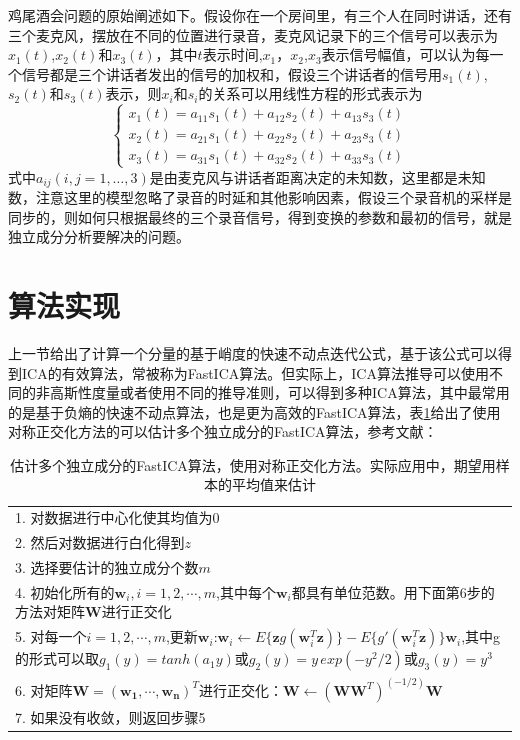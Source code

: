 \documentclass[UTF8,zihao=5,a4paper]{ctexart}
\begin{document}
鸡尾酒会问题的原始阐述如下。假设你在一个房间里，有三个人在同时讲话，还有三个麦克风，摆放在不同的位置进行录音，麦克风记录下的三个信号可以表示为$x_1(t)$,$x_2(t)$和$x_3(t)$，其中$t$表示时间,$x_1$，$x_2$,$x_3$表示信号幅值，可以认为每一个信号都是三个讲话者发出的信号的加权和，假设三个讲话者的信号用$s_1(t)$,$s_2(t)$和$s_3(t)$表示，则$x_i$和$s_i$的关系可以用线性方程的形式表示为
\begin{equation}
    \left\{
        \begin{aligned}
            x_1(t)=a_{11}s_1(t)+a_{12}s_2(t)+a_{13}s_3(t) \\
            x_2(t)=a_{21}s_1(t)+a_{22}s_2(t)+a_{23}s_3(t) \\
            x_3(t)=a_{31}s_1(t)+a_{32}s_2(t)+a_{33}s_3(t)
        \end{aligned}
    \right.
\end{equation}
式中$a_{ij}(i,j=1,\ldots,3)$是由麦克风与讲话者距离决定的未知数，这里都是未知数，注意这里的模型忽略了录音的时延和其他影响因素，假设三个录音机的采样是同步的，则如何只根据最终的三个录音信号，得到变换的参数和最初的信号，就是独立成分分析要解决的问题。







\section{算法实现}

上一节给出了计算一个分量的基于峭度的快速不动点迭代公式，基于该公式可以得到ICA的有效算法，常被称为FastICA算法。但实际上，ICA算法推导可以使用不同的非高斯性度量或者使用不同的推导准则，可以得到多种ICA算法，其中最常用的是基于负熵的快速不动点算法，也是更为高效的FastICA算法，表\ref{fast_ica_alg}给出了使用对称正交化方法的可以估计多个独立成分的FastICA算法，参考文献\cite{ica}：

\begin{table}[h]
    \centering 
    \begin{tabular}{p{}}
        \hline 
        1. 对数据进行中心化使其均值为0\\
        2. 然后对数据进行白化得到$z$\\
        3. 选择要估计的独立成分个数$m$\\
        4. 初始化所有的$\mathbf{w}_i,i=1,2,\cdots,m$,其中每个$\mathbf{w}_i$都具有单位范数。用下面第6步的方法对矩阵$\mathbf{W}$进行正交化\\
        5. 对每一个$i=1,2,\cdots,m$,更新$\mathbf{w}_i$:$\mathbf{w}_i\leftarrow E\{ \mathbf{z} g(\mathbf{w}_i^T\mathbf{z}) \}-E\{ g'(\mathbf{w}_i^T\mathbf{z}) \}\mathbf{w}_i$,其中g的形式可以取$g_1(y)=tanh(a_1y)$或$g_2(y)=y\,exp(-y^2/2)$或$g_3(y)=y^3$\\
        6. 对矩阵$\mathbf{W}=(\mathbf{w_1},\cdots,\mathbf{w_n})^T$进行正交化：$\mathbf{W}\leftarrow(\mathbf{WW}^T)^(-1/2)\mathbf{W}$\\
        7. 如果没有收敛，则返回步骤5\\
        \hline 
    \end{tabular} 
    \caption{估计多个独立成分的FastICA算法，使用对称正交化方法。实际应用中，期望用样本的平均值来估计}
    \label{fast_ica_alg}
\end{table}
\end{document}
